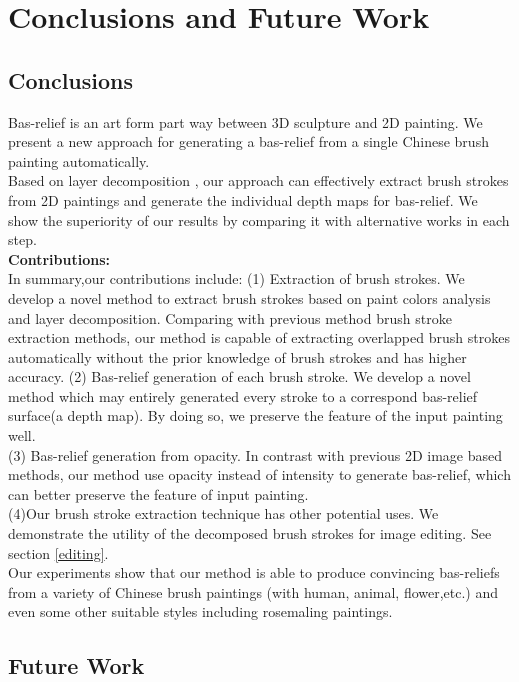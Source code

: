 \chapter{Conclusions and Future Work}
\section{Conclusions}
Bas-relief is an art form part way between 3D sculpture and 2D painting. We present a new approach for generating a bas-relief from a single Chinese brush painting automatically. \\
Based on layer decomposition , our approach can effectively extract brush strokes from 2D paintings and generate the individual depth maps for bas-relief. We show the superiority of our results by comparing it with alternative works in each step.\\
\textbf{Contributions:}\\
In summary,our contributions include:
\newline
(1) Extraction of brush strokes. We develop a novel method to extract brush strokes based on paint colors analysis and layer decomposition.  Comparing with previous method brush stroke extraction methods, our method is capable of extracting overlapped brush strokes automatically without the prior knowledge of brush strokes and has higher accuracy. 
\newline
(2) Bas-relief generation of each brush stroke. We develop a novel method which may entirely generated every stroke to a correspond bas-relief surface(a depth map). By doing so, we preserve the feature of the input painting well.\\
(3) Bas-relief generation from opacity. In contrast with previous 2D image based methods, our method use opacity instead of intensity to generate bas-relief, which can better preserve the feature of input painting.\\ 
(4)Our brush stroke extraction technique has other potential uses. We demonstrate the utility of the decomposed brush strokes for image editing. See section \ref{editing}.\\
Our experiments show that our method is able to produce convincing bas-reliefs from a variety of Chinese brush paintings (with human, animal, flower,etc.)  and even some other suitable styles including rosemaling paintings. \\   
\section{Future Work}

